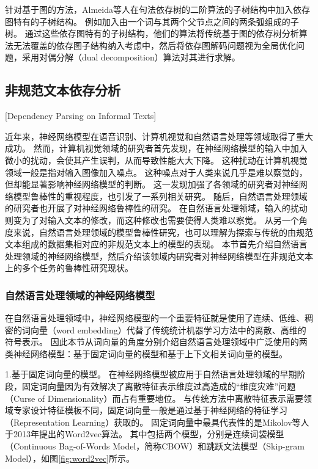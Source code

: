 针对基于图的方法，Almeida等人在句法依存树的二阶算法的子树结构中加入依存图特有的子树结构。\cite{martins-almeida-2014-priberam}
例如加入由一个词与其两个父节点之间的两条弧组成的子树。
通过这些依存图特有的子树结构，他们的算法将传统基于图的依存树分析算法无法覆盖的依存图子结构纳入考虑中，然后将依存图解码问题视为全局优化问题，采用对偶分解（dual decomposition）算法对其进行求解。

\subsection{非规范文本依存分析}[Dependency Parsing on Informal Texts]

近年来，神经网络模型在语音识别、计算机视觉和自然语言处理等领域取得了重大成功。
然而，计算机视觉领域的研究者首先发现，在神经网络模型的输入中加入微小的扰动，会使其产生误判，从而导致性能大大下降。\cite{akhtar-etal-2018-threat}
这种扰动在计算机视觉领域一般是指对输入图像加入噪点。
这种噪点对于人类来说几乎是难以察觉的，但却能显著影响神经网络模型的判断。
这一发现加强了各领域的研究者对神经网络模型鲁棒性的重视程度，也引发了一系列相关研究。
随后，自然语言处理领域的研究者也开展了对神经网络鲁棒性的研究。\cite{zhang-etal-2020-adversarial}
在自然语言处理领域，输入的扰动则变为了对输入文本的修改，而这种修改也需要使得人类难以察觉。
从另一个角度来说，自然语言处理领域的模型鲁棒性研究，也可以理解为探索与传统的由规范文本组成的数据集相对应的非规范文本上的模型的表现。
本节首先介绍自然语言处理领域的神经网络模型，然后介绍该领域内研究者对神经网络模型在非规范文本上的多个任务的鲁棒性研究现状。

\subsubsection{自然语言处理领域的神经网络模型}

在自然语言处理领域中，神经网络模型的一个重要特征就是使用了连续、低维、稠密的词向量（word embedding）代替了传统统计机器学习方法中的离散、高维的符号表示。
因此本节从词向量的角度分别介绍自然语言处理领域中广泛使用的两类神经网络模型：基于固定词向量的模型和基于上下文相关词向量的模型。

1.基于固定词向量的模型。
在神经网络模型被应用于自然语言处理领域的早期阶段，固定词向量因为有效解决了离散特征表示维度过高造成的“维度灾难”问题（Curse of Dimensionality）而占有重要地位。
与传统方法中离散特征表示需要领域专家设计特征模板不同，固定词向量一般是通过基于神经网络的特征学习（Representation Learning）获取的。
固定词向量中最具代表性的是Mikolov等人于2013年提出的Word2vec算法\cite{mikolov-etal-2013-distributed}。
其中包括两个模型，分别是连续词袋模型（Continuous Bag-of-Words Model，简称CBOW）和跳跃文法模型（Skip-gram Model），如图\ref{fig:word2vec}所示。


